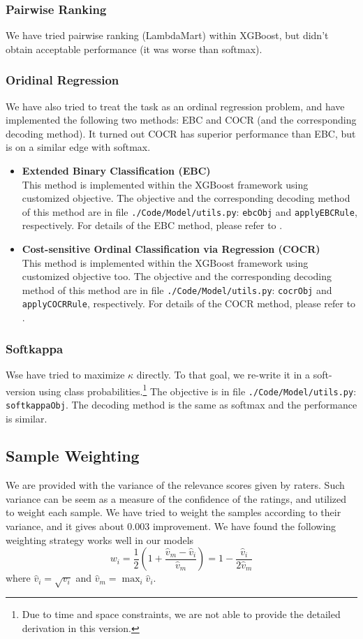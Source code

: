 \documentclass[12pt]{article}
\begin{document}
\subsubsection{Pairwise Ranking}
We have tried pairwise ranking (LambdaMart) within XGBoost, but didn't obtain acceptable performance (it was worse than softmax).

\subsubsection{Oridinal Regression}
We have also tried to treat the task as an ordinal regression problem, and have implemented the following two methods: EBC and COCR (and the corresponding decoding method). It turned out COCR has superior performance than EBC, but is on a similar edge with softmax.
\begin{itemize}
\item \textbf{Extended Binary Classification (EBC)}\\
This method is implemented within the XGBoost framework using customized objective. The objective and the corresponding decoding method of this method are in file \texttt{./Code/Model/utils.py}: \texttt{ebcObj} and \texttt{applyEBCRule}, respectively. For details of the EBC method, please refer to \cite{ebc}.
\item \textbf{Cost-sensitive Ordinal Classification via Regression (COCR)}\\
This method is implemented within the XGBoost framework using customized objective too. The objective and the corresponding decoding method of this method are in file \texttt{./Code/Model/utils.py}: \texttt{cocrObj} and \texttt{applyCOCRRule}, respectively. For details of the COCR method, please refer to \cite{cocr}.
\end{itemize}

\subsubsection{Softkappa}
Wse have tried to maximize $\kappa$ directly. To that goal, we re-write it in a soft-version using class probabilities.\footnote{Due to time and space constraints, we are not able to provide the detailed derivation in this version.} The objective is in file \texttt{./Code/Model/utils.py}: \texttt{softkappaObj}. The decoding method is the same as softmax and the performance is similar.

\subsection{Sample Weighting}
We are provided with the variance of the relevance scores given by raters. Such variance can be seem as a measure of the confidence of the ratings, and utilized to weight each sample. We have tried to weight the samples according to their variance, and it gives about 0.003 improvement. We have found the following weighting strategy works well in our models
\begin{equation}
w_i = \frac{1}{2}(1 + \frac{\hat{v}_m - \hat{v}_i}{\hat{v}_m})=1-\frac{\hat{v}_i}{2\hat{v}_m}
\end{equation}
where $\hat{v}_i = \sqrt{v_i}$ and $\hat{v}_m = \max_{i} \hat{v}_i$.
\end{document}
